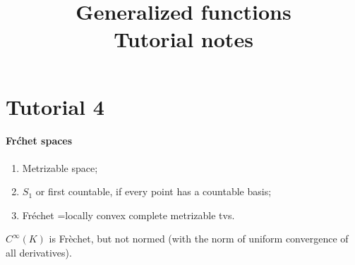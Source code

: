 \documentclass[12pt, reqno,a4paper, twoside]{amsproc}
\title{Generalized functions\\Tutorial notes}
\begin{document}
\maketitle
\part*{Tutorial 4}\setcounter{section}{4}
\subsection{Fr\'chet spaces}
\begin{defi}
	\begin{enumerate}
		\item  Metrizable space;
		\item  $S_1$ or first countable, if every point has a countable basis;
		\item Fr\'echet =locally convex complete metrizable tvs.
	\end{enumerate}
\end{defi}
\begin{exam} $C^{\infty}(K)$ is Fr\`echet, but not normed (with the norm of uniform convergence of all derivatives). 
\end{exam}
\end{document}
